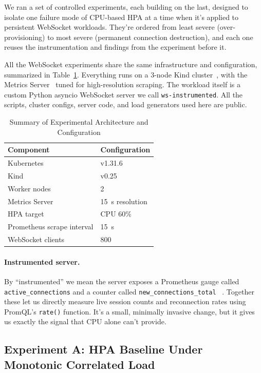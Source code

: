 \documentclass[pdflatex,sn-mathphys-num]{sn-jnl}
\theoremstyle{thmstyleone}%
\theoremstyle{thmstyletwo}%
\theoremstyle{thmstylethree}%
\begin{document}
We ran a set of controlled experiments, each building on the last, designed to
isolate one failure mode of CPU-based HPA at a time when it's applied to
persistent WebSocket workloads. They're ordered from least severe
(over-provisioning) to most severe (permanent connection destruction), and each one
reuses the instrumentation and findings from the experiment before it.

All the WebSocket experiments share the same infrastructure and configuration,
summarized in Table~\ref{tab:architecture}. Everything runs on a 3-node Kind
cluster~\cite{kind_docs,merkel2014docker}, with the Metrics
Server~\cite{k8s_metrics_server} tuned for high-resolution scraping. The workload
itself is a custom Python asyncio WebSocket server we call \texttt{ws-instrumented}.
All the scripts, cluster configs, server code, and load generators used here are
public.

\begin{table}[htbp]
\centering
\caption{Summary of Experimental Architecture and Configuration}
\label{tab:architecture}
\begin{tabular}{ll}
\toprule
\textbf{Component} & \textbf{Configuration} \\
\midrule
Kubernetes & v1.31.6 \\
Kind & v0.25 \\
Worker nodes & 2 \\
Metrics Server & 15~s resolution \\
HPA target & CPU 60\% \\
Prometheus scrape interval & 15~s \\
WebSocket clients & 800 \\
\bottomrule
\end{tabular}
\end{table}

\paragraph{Instrumented server.}
By ``instrumented'' we mean the server exposes a Prometheus gauge called
\texttt{active\_connections} and a counter called \texttt{new\_connections\_total}
~\cite{prometheus_client_python,prometheus_docs}. Together these let us directly
measure live session counts and reconnection rates using PromQL's \texttt{rate()}
function. It's a small, minimally invasive change, but it gives us exactly the
signal that CPU alone can't provide.

\subsection{Experiment A: HPA Baseline Under Monotonic Correlated Load}
\end{document}
